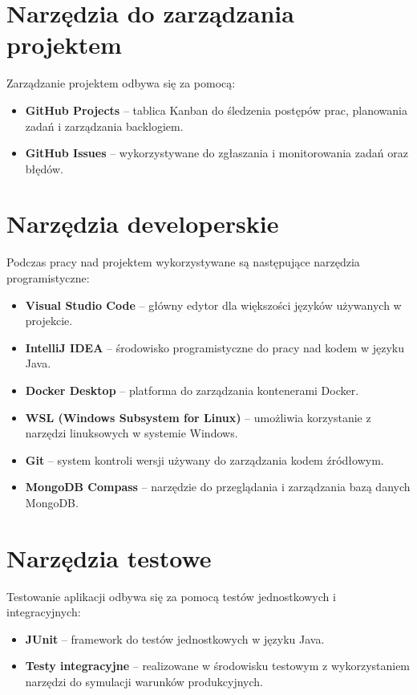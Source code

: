 \documentclass[12pt,a4paper,colorlinks=true,linkcolor=NavyBlue,citecolor=red,urlcolor=NavyBlue]{book}
\begin{document}
\section{Narzędzia do zarządzania projektem}  
Zarządzanie projektem odbywa się za pomocą:  
\begin{itemize}  
    \item \textbf{GitHub Projects} – tablica Kanban do śledzenia postępów prac, planowania zadań i zarządzania backlogiem.  
    \item \textbf{GitHub Issues} – wykorzystywane do zgłaszania i monitorowania zadań oraz błędów.  
\end{itemize}

\section{Narzędzia developerskie}  
Podczas pracy nad projektem wykorzystywane są następujące narzędzia programistyczne:  
\begin{itemize}  
    \item \textbf{Visual Studio Code} – główny edytor dla większości języków używanych w projekcie.  
    \item \textbf{IntelliJ IDEA} – środowisko programistyczne do pracy nad kodem w języku Java.  
    \item \textbf{Docker Desktop} – platforma do zarządzania kontenerami Docker.  
    \item \textbf{WSL (Windows Subsystem for Linux)} – umożliwia korzystanie z narzędzi linuksowych w systemie Windows.  
    \item \textbf{Git} – system kontroli wersji używany do zarządzania kodem źródłowym.  
    \item \textbf{MongoDB Compass} – narzędzie do przeglądania i zarządzania bazą danych MongoDB.  
\end{itemize}  

\section{Narzędzia testowe}  
Testowanie aplikacji odbywa się za pomocą testów jednostkowych i integracyjnych:  
\begin{itemize}  
    \item \textbf{JUnit} – framework do testów jednostkowych w języku Java.  
    \item \textbf{Testy integracyjne} – realizowane w środowisku testowym z wykorzystaniem narzędzi do symulacji warunków produkcyjnych.  
\end{itemize}  
\end{document}
